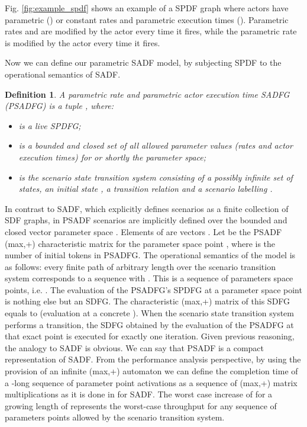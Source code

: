 \documentclass[]{eptcs}
\newtheorem{mydef}{Definition}
\begin{document}
Fig. \ref{fig:example_spdf} shows an example of a SPDF graph where actors have parametric () or constant rates and parametric execution times (). Parametric rates  and  are modified by the actor  every time it fires, while the parametric rate  is modified by the actor  every  time it fires.

Now we can define our parametric SADF model, by subjecting SPDF to the operational semantics of SADF.
\begin{mydef}
A parametric rate and parametric actor execution time SADFG (PSADFG) is a tuple  , where:
\begin{itemize}
\item  is a live SPDFG;
\item  is a bounded and closed set of all allowed parameter values (rates and actor execution times) for  or shortly the parameter space;
\item  is the scenario state transition system consisting of a possibly infinite set  of states, an initial state , a transition relation  and a scenario labelling .
\end{itemize}
\end{mydef}
In contrast to SADF, which explicitly defines scenarios as a finite collection of SDF graphs, in PSADF scenarios are implicitly defined over the bounded and closed vector parameter space . Elements of  are vectors . Let  be the PSADF (max,+) characteristic  matrix for the parameter space point , where  is the number of initial tokens in PSADFG.
The operational semantics of the model is as follows: every finite path of arbitrary length  over the scenario transition system  corresponds to a sequence  with . This is a sequence of parameters space points, i.e. . The evaluation of the PSADFG's SPDFG  at a parameter space point is nothing else but an SDFG. The characteristic (max,+) matrix of this SDFG equals to  (evaluation at a concrete ). When the scenario state transition system performs a transition, the SDFG obtained by the evaluation of the PSADFG at that exact point is executed for exactly one iteration. Given previous reasoning, the analogy to SADF is obvious. We can say that PSADF is a compact representation of SADF. From the performance analysis perspective, by using the provision of an infinite (max,+) automaton \cite{2gaub} we can define the completion time of a -long sequence of parameter point activations as a sequence of (max,+) matrix multiplications  as it is done in \cite{2geil:all} for SADF. The worst case increase of  for a growing length of  represents the worst-case throughput for any sequence of parameters points allowed by the scenario transition system.
\end{document}
